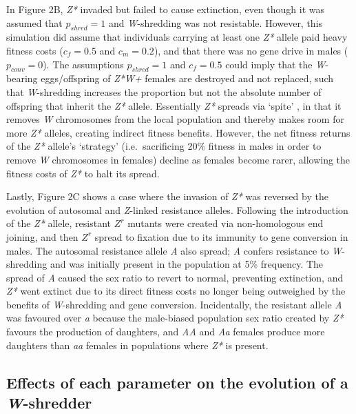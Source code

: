 \documentclass[]{rsos}%
\begin{document}
In Figure 2B, \emph{Z*} invaded but failed to cause extinction, even
though it was assumed that \(p_{shred} = 1\) and \emph{W}-shredding was
not resistable. However, this simulation did assume that individuals
carrying at least one \emph{Z*} allele paid heavy fitness costs
(\(c_f = 0.5\) and \(c_m = 0.2\)), and that there was no gene drive in
males (\(p_{conv} = 0\)). The assumptions \(p_{shred} = 1\) and
\(c_f = 0.5\) could imply that the \emph{W}-bearing eggs/offspring of
\emph{Z*W+} females are destroyed and not replaced, such that
\emph{W}-shredding increases the proportion but not the absolute number
of offspring that inherit the \emph{Z*} allele. Essentially \emph{Z*}
spreads via `spite' \citep{gardner2006sp}, in that it removes \emph{W}
chromosomes from the local population and thereby makes room for more
\emph{Z*} alleles, creating indirect fitness benefits. However, the net
fitness returns of the \emph{Z*} allele's `strategy' (i.e.~sacrificing
20\% fitness in males in order to remove \emph{W} chromosomes in
females) decline as females become rarer, allowing the fitness costs of
\emph{Z*} to halt its spread.

Lastly, Figure 2C shows a case where the invasion of \emph{Z*} was
reversed by the evolution of autosomal and \emph{Z}-linked resistance
alleles. Following the introduction of the \emph{Z*} allele, resistant
\(Z^r\) mutants were created via non-homologous end joining, and then
\(Z^r\) spread to fixation due to its immunity to gene conversion in
males. The autosomal resistance allele \emph{A} also spread; \emph{A}
confers resistance to \emph{W}-shredding and was initially present in
the population at 5\% frequency. The spread of \emph{A} caused the sex
ratio to revert to normal, preventing extinction, and \emph{Z*} went
extinct due to its direct fitness costs no longer being outweighed by
the benefits of \emph{W}-shredding and gene conversion. Incidentally,
the resistant allele \emph{A} was favoured over \emph{a} because the
male-biased population sex ratio created by \emph{Z*} favours the
production of daughters, and \emph{AA} and \emph{Aa} females produce
more daughters than \emph{aa} females in populations where \emph{Z*} is
present.

\hypertarget{effects-of-each-parameter-on-the-evolution-of-a-w-shredder}{%
\subsection{\texorpdfstring{Effects of each parameter on the evolution
of a
\emph{W}-shredder}{Effects of each parameter on the evolution of a W-shredder}}\label{effects-of-each-parameter-on-the-evolution-of-a-w-shredder}}
\end{document}
